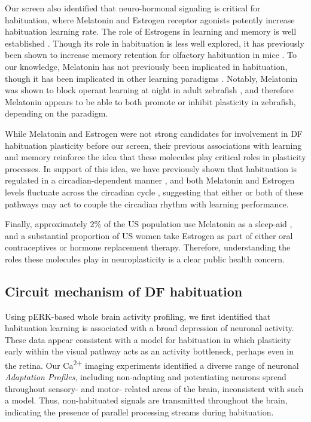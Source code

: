 \documentclass[9pt,lineno]{RandlettLab_elife}
\begin{document}
Our screen also identified that neuro-hormonal signaling is critical for habituation, where Melatonin and Estrogen receptor agonists potently increase habituation learning rate. The role of Estrogens in learning and memory is well established \cite{Luine1998-iz,Nilsson2002-fi}. Though its role in habituation is less well explored, it has previously been shown to increase memory retention for olfactory habituation in mice \cite{Dillon2013-ez}. To our knowledge, Melatonin has not previously been implicated in habituation, though it has been implicated in other learning paradigms \cite{El-Sherif2003-tv, Jilg2019-lq}. Notably, Melatonin was shown to block operant learning at night in adult zebrafish \cite{Rawashdeh2007-ts}, and therefore Melatonin appears to be able to both promote or inhibit plasticity in zebrafish, depending on the paradigm. 

While Melatonin and Estrogen were not strong candidates for involvement in DF habituation plasticity before our screen, their previous associations with learning and memory reinforce the idea that these molecules play critical roles in plasticity processes. In support of this idea, we have previously shown that habituation is regulated in a circadian-dependent manner \cite{Randlett2019-fi}, and both Melatonin and Estrogen levels fluctuate across the circadian cycle \cite{Alvord2022-ii, Gandhi2015-vw, Zhdanova2001-dq}, suggesting that either or both of these pathways may act to couple the circadian rhythm with learning performance. 

Finally, approximately 2\% of the US population use Melatonin as a sleep-aid \cite{Li2022-lu}, and a substantial proportion of US women take Estrogen as part of either oral contraceptives or hormone replacement therapy. Therefore, understanding the roles these molecules play in neuroplasticity is a clear public health concern. 

\subsection{Circuit mechanism of DF habituation}

Using pERK-based whole brain activity profiling, we first identified that habituation learning is associated with a broad depression of neuronal activity. These data appear consistent with a model for habituation in which plasticity early within the visual pathway acts as an activity bottleneck, perhaps even in the retina. Our Ca\textsuperscript{2+} imaging experiments identified a diverse range of neuronal \emph{Adaptation Profiles}, including non-adapting and potentiating neurons spread throughout sensory- and motor- related areas of the brain, inconsistent with such a model. Thus, non-habituated signals are transmitted throughout the brain, indicating the presence of parallel processing streams during habituation. 
\end{document}
